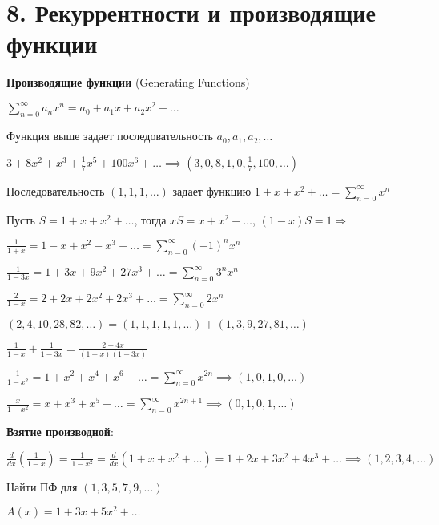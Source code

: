 \documentclass[12pt]{article}
\begin{document}
    \clearpage


    \section{8. Рекуррентности и производящие функции}

    \item \textbf{Производящие функции} (Generating Functions)

    $\sum_{n = 0}^\infty a_n x^n = a_0 + a_1 x + a_2 x^2 + \dots$

    Функция выше задает последовательность $a_0, a_1, a_2, \dots$

    \Ex $3 + 8x^2 + x^3 + \frac{1}{7}x^5 + 100x^6 + \dots \implies (3, 0, 8, 1, 0, \frac{1}{7}, 100, \dots)$

    \Ex Последовательность $(1, 1, 1, \dots)$ задает функцию $1 + x + x^2 + \dots = \sum_{n = 0}^\infty x^n$

    Пусть $S = 1 + x + x^2 + \dots$, тогда $xS = x + x^2 + \dots$, $(1 - x) S = 1 \Longrightarrow $


    \Ex

    $\frac{1}{1 + x} = 1 - x + x^2 - x^3 + \dots = \sum_{n = 0}^\infty (-1)^n x^n$

    $\frac{1}{1 - 3x} = 1 + 3x + 9x^2 + 27x^3 + \dots = \sum_{n = 0}^\infty 3^n x^n$

    $\frac{2}{1 - x} = 2 + 2x + 2x^2 + 2x^3 + \dots = \sum_{n = 0}^\infty 2 x^n$

    $(2, 4, 10, 28, 82, \dots) = (1, 1, 1, 1, 1, \dots) + (1, 3, 9, 27, 81, \dots)$

    $\frac{1}{1 - x} + \frac{1}{1 - 3x} = \frac{2 - 4x}{(1 - x)(1 - 3x)}$

    $\frac{1}{1 - x^2} = 1 + x^2 + x^4 + x^6 + \dots = \sum_{n = 0}^\infty x^{2n} \implies (1, 0, 1, 0, \dots)$

    $\frac{x}{1 - x^2} = x + x^3 + x^5 + \dots = \sum_{n = 0}^\infty x^{2n + 1} \implies (0, 1, 0, 1, \dots)$

    \textbf{Взятие производной}:

    $\frac{d}{dx} (\frac{1}{1 - x}) = \frac{1}{1 - x^2} = \frac{d}{dx} (1 + x + x^2 + \dots) = 1 + 2x + 3x^2 + 4x^3 + \dots \implies (1, 2, 3, 4, \dots)$

    \Ex Найти ПФ для $(1, 3, 5, 7, 9, \dots)$

    $A(x) = 1 + 3x + 5x^2 + \dots$
\end{document}
